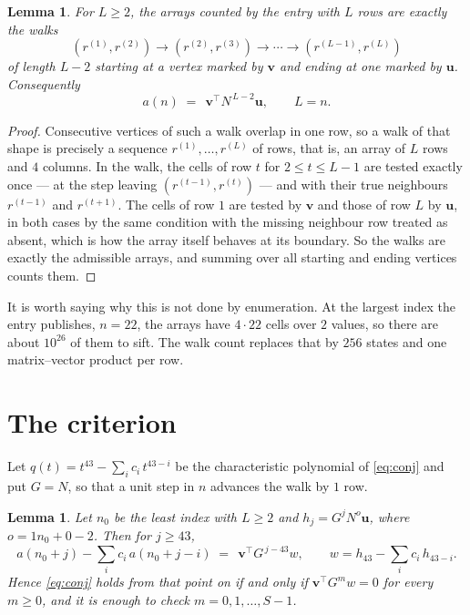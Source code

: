 \documentclass[11pt,a4paper]{article}
\theoremstyle{plain}
\newtheorem{lemma}[theorem]{Lemma}
\theoremstyle{definition}
\begin{document}
\begin{lemma}\label{lem:walk}
For $L\ge2$, the arrays counted by the entry with $L$ rows are exactly the walks
\[
(r^{(1)},r^{(2)})\to(r^{(2)},r^{(3)})\to\cdots\to(r^{(L-1)},r^{(L)})
\]
of length $L-2$ starting at a vertex marked by $\mathbf{v}$ and ending at one marked by
$\mathbf{u}$. Consequently
\[
a(n)\;=\;\,\mathbf{v}^{\!\top}N^{\,L-2}\mathbf{u},\qquad L=n .
\]
\end{lemma}

\begin{proof}
Consecutive vertices of such a walk overlap in one row, so a walk of that shape is
precisely a sequence $r^{(1)},\dots,r^{(L)}$ of rows, that is, an array of $L$ rows
and $4$ columns. In the walk, the cells of row $t$ for $2\le t\le L-1$ are tested
exactly once --- at the step leaving $(r^{(t-1)},r^{(t)})$ --- and with their true
neighbours $r^{(t-1)}$ and $r^{(t+1)}$. The cells of row $1$ are tested by
$\mathbf{v}$ and those of row $L$ by $\mathbf{u}$, in both cases by the same condition
with the missing neighbour row treated as absent, which is how the array itself behaves at
its boundary. So the walks are exactly the admissible arrays, and summing over all starting
and ending vertices counts them.
\end{proof}


It is worth saying why this is not done by enumeration. At the largest index the entry
publishes, $n=22$, the arrays have $4\cdot22$ cells over
$2$ values, so there are about $10^{26}$ of them to sift. The
walk count replaces that by $256$ states and one matrix--vector product per row.
\section{The criterion}

Let $q(t)=t^{43}-\sum_i c_i\,t^{43-i}$ be the characteristic polynomial of
\eqref{eq:conj} and put $G=N$, so that a unit step in $n$ advances the walk by
$1$ row.

\begin{lemma}\label{lem:crit}
Let $n_0$ be the least index with $L\ge2$ and $h_j=G^{j}N^{o}\mathbf{u}$, where
$o=1n_0+0-2$. Then for $j\ge43$,
\[
a(n_0+j)-\sum_i c_i\,a(n_0+j-i)\;=\;\,\mathbf{v}^{\!\top}G^{\,j-43}w,
\qquad w=h_{43}-\sum_i c_i\,h_{43-i} .
\]
Hence \eqref{eq:conj} holds from that point on if and only if
$\mathbf{v}^{\!\top}G^{m}w=0$ for every $m\ge0$, and it is enough to check
$m=0,1,\dots,S-1$.
\end{lemma}
\end{document}
